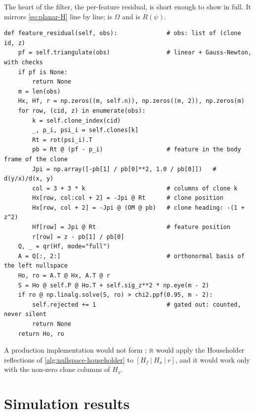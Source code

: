 The heart of the filter, the per-feature residual, is short enough to show in full. It mirrors \eqref{eq:planar-H} line by line;
 is $\Omega$ and  is $R(\psi)$.

\begin{lstlisting}[style=py]
def feature_residual(self, obs):              # obs: list of (clone id, z)
    pf = self.triangulate(obs)                # linear + Gauss-Newton, with checks
    if pf is None:
        return None
    m = len(obs)
    Hx, Hf, r = np.zeros((m, self.n)), np.zeros((m, 2)), np.zeros(m)
    for row, (cid, z) in enumerate(obs):
        k = self.clone_index(cid)
        _, p_i, psi_i = self.clones[k]
        Rt = rot(psi_i).T
        pb = Rt @ (pf - p_i)                  # feature in the body frame of the clone
        Jpi = np.array([-pb[1] / pb[0]**2, 1.0 / pb[0]])   # d(y/x)/d(x, y)
        col = 3 + 3 * k                       # columns of clone k
        Hx[row, col:col + 2] = -Jpi @ Rt      # clone position
        Hx[row, col + 2] = -Jpi @ (OM @ pb)   # clone heading: -(1 + z^2)
        Hf[row] = Jpi @ Rt                    # feature position
        r[row] = z - pb[1] / pb[0]
    Q, _ = qr(Hf, mode="full")
    A = Q[:, 2:]                              # orthonormal basis of the left nullspace
    Ho, ro = A.T @ Hx, A.T @ r
    S = Ho @ self.P @ Ho.T + self.sig_z**2 * np.eye(m - 2)
    if ro @ np.linalg.solve(S, ro) > chi2.ppf(0.95, m - 2):
        self.rejected += 1                    # gated out: counted, never silent
        return None
    return Ho, ro
\end{lstlisting}

A production implementation would not form ; it would apply the Householder reflections of \cref{alg:nullspace-householder} to
$[H_f\ |\ H_x\ |\ r]$, and it would work only with the non-zero clone columns of $H_x$.

\section{Simulation results}

